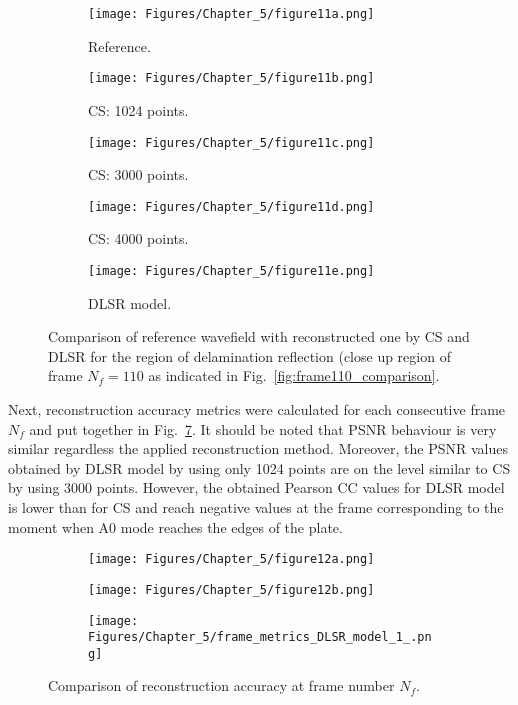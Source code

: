 \begin{figure} [h!]
	\centering
	\begin{subfigure}[b]{0.32\textwidth}
		\centering
		\texttt{[image: Figures/Chapter\_5/figure11a.png]}
		\caption{Reference.}
		\label{fig:frame110delam_ref}
	\end{subfigure}
	\hfill
	\begin{subfigure}[b]{0.32\textwidth}
		\centering
		\texttt{[image: Figures/Chapter\_5/figure11b.png]}
		\caption{CS: 1024 points.}
		\label{fig:frame110delam_CS1024}
	\end{subfigure}
	\hfill
	\begin{subfigure}[b]{0.32\textwidth}
		\centering
		\texttt{[image: Figures/Chapter\_5/figure11c.png]}
		\caption{CS: 3000 points.}
		\label{fig:frame110delam_CS3000}
	\end{subfigure}	
	\hfill
	\begin{subfigure}[b]{0.32\textwidth}
		\centering
		\texttt{[image: Figures/Chapter\_5/figure11d.png]}
		\caption{CS: 4000 points.}
		\label{fig:frame110delam_CS4000}
	\end{subfigure}
	\begin{subfigure}[b]{0.32\textwidth}
		\centering
		\texttt{[image: Figures/Chapter\_5/figure11e.png]}
		\caption{DLSR model.}
		\label{fig:frame110delam_Abdalraheem}
	\end{subfigure}
	\caption{Comparison of reference wavefield with reconstructed one by CS and DLSR for the region of delamination reflection (close up region of frame $N_f = 110$ as indicated in Fig.~\ref{fig:frame110_comparison}.}
	\label{fig:frame110del_comparison}
\end{figure} 

Next, reconstruction accuracy metrics were calculated for each consecutive frame $N_f$ and put together in Fig.~\ref{fig:frame_metrics}.
It should be noted that PSNR behaviour is very similar regardless the applied reconstruction method.
Moreover, the PSNR values obtained by DLSR model by using only 1024 points are on the level similar to CS by using 3000 points.
However, the obtained Pearson CC values for DLSR model is lower than for CS and reach negative values at the frame corresponding to the moment when A0 mode reaches the edges of the plate.
\begin{figure} [h!]
	\centering
	\begin{subfigure}[b]{1\textwidth}
		\centering
		\texttt{[image: Figures/Chapter\_5/figure12a.png]}
	\end{subfigure}
	\vfill
	\begin{subfigure}[b]{1\textwidth}
		\centering
		\texttt{[image: Figures/Chapter\_5/figure12b.png]}
	\end{subfigure}
	\vfill
	\begin{subfigure}[b]{1\textwidth}
		\centering
		\texttt{[image: Figures/Chapter\_5/frame\_metrics\_DLSR\_model\_1\_.png]}
	\end{subfigure}	
	\caption{Comparison of reconstruction accuracy at frame number $N_f$.}
	\label{fig:frame_metrics}
\end{figure}

